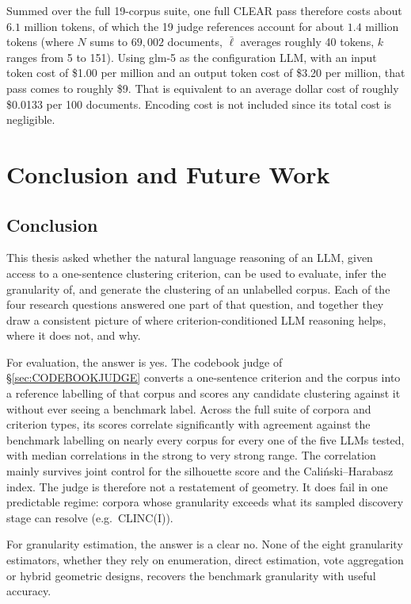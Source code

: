 \documentclass[11pt,a4paper,oneside]{report}
\begin{document}
Summed over the full 19-corpus suite, one full CLEAR pass therefore costs about $6.1$ million tokens, of which the 19 judge references account for about $1.4$ million tokens (where $N$ sums to $69{,}002$ documents, $\bar{\ell}$ averages roughly 40 tokens, $k$ ranges from 5 to 151). Using {\small\ttfamily glm-5} as the configuration LLM, with an input token cost of \$1.00 per million and an output token cost of \$3.20 per million, that pass comes to roughly \$9. That is equivalent to an average dollar cost of roughly \$0.0133 per 100 documents. Encoding cost is not included since its total cost is negligible.


\FloatBarrier
\chapter{Conclusion and Future Work}
\section{Conclusion}

This thesis asked whether the natural language reasoning of an LLM,
given access to a one-sentence clustering criterion, can be used
to evaluate, infer the granularity of, and generate the clustering of an unlabelled corpus. Each
of the four research questions answered one part of that question, and
together they draw a consistent picture of where criterion-conditioned
LLM reasoning helps, where it does not, and why.

For evaluation, the answer is yes. The codebook judge of
\S\ref{sec:CODEBOOKJUDGE} converts a one-sentence criterion and the corpus into a
reference labelling of that corpus and scores any candidate clustering against it
without ever seeing a benchmark label. Across the full suite of corpora
and criterion types, its scores correlate significantly with agreement
against the benchmark labelling on nearly every corpus for every one of the
five LLMs tested, with median correlations in the strong to very
strong range. The correlation mainly survives joint control for the
silhouette score and the Cali\'nski--Harabasz index. The judge is
therefore not a restatement of geometry. It does fail in one predictable regime: corpora whose
granularity exceeds what its sampled discovery stage can resolve (e.g.\ CLINC(I)). 


For granularity estimation, the answer is a clear no. None of the eight granularity estimators, whether they rely on enumeration, direct estimation, vote aggregation or hybrid
geometric designs, recovers the benchmark granularity with useful
accuracy.
\end{document}
